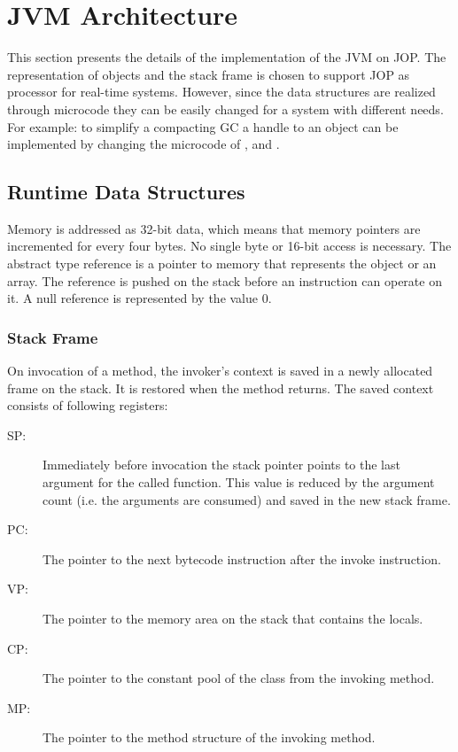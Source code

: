 \section{JVM Architecture}

This section presents the details of the implementation of the JVM
on JOP. The representation of objects and the stack frame is chosen
to support JOP as processor for real-time systems. However, since
the data structures are realized through microcode they can be
easily changed for a system with different needs. For example: to
simplify a compacting GC a handle to an object can be implemented by
changing the microcode of ,  and
.

\subsection{Runtime Data Structures}

Memory is addressed as 32-bit data, which means that memory pointers
are incremented for every four bytes. No single byte or 16-bit
access is necessary. The abstract type reference is a pointer to
memory that represents the object or an array. The reference is
pushed on the stack before an instruction can operate on it. A null
reference is represented by the value 0.

\subsubsection{Stack Frame}

On invocation of a method, the invoker's context is saved in a newly
allocated frame on the stack. It is restored when the method
returns. The saved context consists of following registers:

\begin{description}

\item[SP:] Immediately before invocation the stack pointer points to
the last argument for the called function. This value is reduced by
the argument count (i.e. the arguments are consumed) and saved in
the new stack frame.

\item[PC:] The pointer to the next bytecode instruction after the invoke
instruction.

\item[VP:] The pointer to the memory area on the stack that contains
the locals.

\item[CP:] The pointer to the constant pool of the class from the invoking
method.

\item[MP:] The pointer to the method structure of the invoking method.

\end{description}

